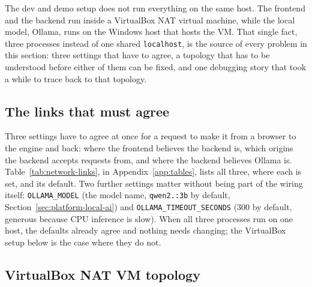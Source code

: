 The dev and demo setup does not run everything on the same host. The frontend and the backend run inside a VirtualBox NAT virtual machine, while the local model, Ollama, runs on the Windows host that hosts the VM. That single fact, three processes instead of one shared \texttt{localhost}, is the source of every problem in this section: three settings that have to agree, a topology that has to be understood before either of them can be fixed, and one debugging story that took a while to trace back to that topology.

\subsection{The links that must agree}

Three settings have to agree at once for a request to make it from a browser to the engine and back: where the frontend believes the backend is, which origins the backend accepts requests from, and where the backend believes Ollama is. Table~\ref{tab:network-links}, in Appendix~\ref{app:tables}, lists all three, where each is set, and its default. Two further settings matter without being part of the wiring itself: \texttt{OLLAMA\_\allowbreak MODEL} (the model name, \texttt{qwen2.:\allowbreak 3b} by default, Section~\ref{sec:platform-local-ai}) and \texttt{OLLAMA\_\allowbreak TIMEOUT\_\allowbreak SECONDS} (300 by default, generous because CPU inference is slow). When all three processes run on one host, the defaults already agree and nothing needs changing; the VirtualBox setup below is the case where they do not.

\subsection{VirtualBox NAT VM topology}


